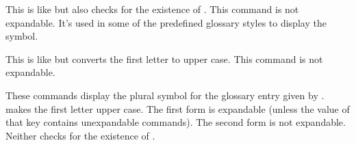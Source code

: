 \documentclass[report,inlinetitle]{nlctdoc}
\begin{document}
\begin{definition}[\DescribeMacro{\glossentrysymbol}]
\end{definition}
This is like 
but also checks for the existence of . This command is
not expandable. It's used in some of the predefined glossary styles to
display the symbol.
\begin{definition}[\DescribeMacro{\Glossentrysymbol}]
\end{definition}
This is like  but converts the first letter to
upper case. This command is not expandable.

\begin{definition}[\DescribeMacro{\glsentrysymbolplural}]
\end{definition}
\begin{definition}[\DescribeMacro{\Glsentrysymbolplural}]
\end{definition}
These commands display the plural symbol for the glossary entry
given by .  makes the first
letter upper case.
The first form is expandable (unless the value of that key contains unexpandable
commands). The second form is not expandable. Neither checks for the
existence of .
\end{document}

